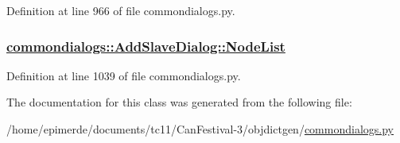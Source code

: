 Definition at line 966 of file commondialogs.py.\hypertarget{classcommondialogs_1_1AddSlaveDialog_74c3506f4b1c4fa83d88c013eed6c727}{
\subsubsection[NodeList]{\setlength{\rightskip}{0pt plus 5cm}\hyperlink{classcommondialogs_1_1AddSlaveDialog_74c3506f4b1c4fa83d88c013eed6c727}{commondialogs::Add\-Slave\-Dialog::Node\-List}}}
\label{classcommondialogs_1_1AddSlaveDialog_74c3506f4b1c4fa83d88c013eed6c727}




Definition at line 1039 of file commondialogs.py.

The documentation for this class was generated from the following file:\begin{CompactItemize}
\item 
/home/epimerde/documents/tc11/Can\-Festival-3/objdictgen/\hyperlink{commondialogs_8py}{commondialogs.py}\end{CompactItemize}
